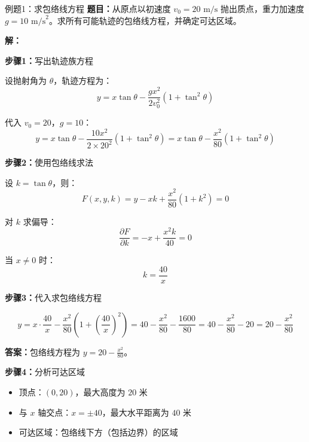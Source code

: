 \documentclass[a4paper,11pt]{ctexart}
\begin{document}
\begin{examplebox}{例题1：求包络线方程}
\textbf{题目：}从原点以初速度 $v_0 = 20\text{ m/s}$ 抛出质点，重力加速度 $g = 10\text{ m/s}^2$。求所有可能轨迹的包络线方程，并确定可达区域。

\textbf{解：}

\textbf{步骤1：}写出轨迹族方程

设抛射角为 $\theta$，轨迹方程为：
\[ y = x\tan\theta - \frac{gx^2}{2v_0^2}(1 + \tan^2\theta) \]

代入 $v_0 = 20$，$g = 10$：
\[ y = x\tan\theta - \frac{10x^2}{2 \times 20^2}(1 + \tan^2\theta) = x\tan\theta - \frac{x^2}{80}(1 + \tan^2\theta) \]

\textbf{步骤2：}使用包络线求法

设 $k = \tan\theta$，则：
\[ F(x, y, k) = y - xk + \frac{x^2}{80}(1 + k^2) = 0 \]

对 $k$ 求偏导：
\[ \frac{\partial F}{\partial k} = -x + \frac{x^2k}{40} = 0 \]

当 $x \neq 0$ 时：
\[ k = \frac{40}{x} \]

\textbf{步骤3：}代入求包络线方程

\[ y = x \cdot \frac{40}{x} - \frac{x^2}{80}\left(1 + \left(\frac{40}{x}\right)^2\right) = 40 - \frac{x^2}{80} - \frac{1600}{80} = 40 - \frac{x^2}{80} - 20 = 20 - \frac{x^2}{80} \]

\textbf{答案：}包络线方程为 $y = 20 - \frac{x^2}{80}$。

\textbf{步骤4：}分析可达区域

\begin{itemize}
    \item 顶点：$(0, 20)$，最大高度为 $20$ 米
    \item 与 $x$ 轴交点：$x = \pm 40$，最大水平距离为 $40$ 米
    \item 可达区域：包络线下方（包括边界）的区域
\end{itemize}
\end{examplebox}
\end{document}
